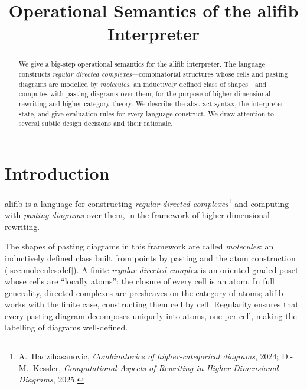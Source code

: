 \documentclass[acmsmall,screen,nonacm]{acmart}
\begin{document}
\title{Operational Semantics of the \textsf{alifib} Interpreter}
\author{} \date{}

\begin{abstract}
We give a big-step operational semantics for the \textsf{alifib}
interpreter.  The language constructs \emph{regular directed complexes}---combinatorial
structures whose cells and pasting diagrams are modelled by
\emph{molecules}, an inductively defined class of shapes---and computes
with pasting diagrams over them, for the purpose of higher-dimensional
rewriting and higher category theory.  We describe the abstract syntax, the interpreter state,
and give evaluation rules for every language construct.  We draw attention
to several subtle design decisions and their rationale.
\end{abstract}

\maketitle

\tableofcontents

\section{Introduction}
\label{sec:intro}

\textsf{alifib} is a language for constructing \emph{regular directed
complexes}\footnote{A.\ Hadzihasanovic, \emph{Combinatorics of
higher-categorical diagrams}, 2024; D.-M.\ Kessler,
\emph{Computational Aspects of Rewriting in Higher-Dimensional
Diagrams}, 2025.} and computing with \emph{pasting diagrams} over
them, in the framework of higher-dimensional rewriting.

The shapes of pasting diagrams in this framework are called
\emph{molecules}: an inductively defined class built from points by
pasting and the atom construction (\cref{sec:molecules:def}).  A
finite \emph{regular directed complex} is an oriented graded poset
whose cells are ``locally atoms'': the closure of every cell is an
atom.  In full generality, directed complexes are presheaves on the
category of atoms; \textsf{alifib} works with the finite case,
constructing them cell by cell.  Regularity ensures that every pasting
diagram decomposes uniquely into atoms, one per cell, making the
labelling of diagrams well-defined.
\end{document}

